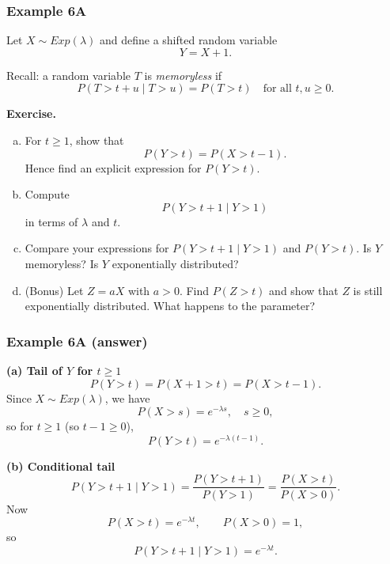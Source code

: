 \documentclass[t,8pt]{beamer}
\begin{document}
\begin{frame}
	\frametitle{Example 6A}
	
	Let $X \sim Exp(\lambda)$ and define a shifted random variable
	\[
	Y = X + 1.
	\]
	
	Recall: a random variable $T$ is \emph{memoryless} if
	\[
	P(T > t + u \mid T > u) = P(T > t)
	\quad \text{for all } t,u \ge 0.
	\]
	
	\vspace{4pt}
	\textbf{Exercise.}
	\begin{enumerate}[(a)]
		\item For $t \ge 1$, show that
		\[
		P(Y > t) = P(X > t - 1).
		\]
		Hence find an explicit expression for $P(Y > t)$.
		\item Compute
		\[
		P(Y > t+1 \mid Y > 1)
		\]
		in terms of $\lambda$ and $t$.
		\item Compare your expressions for $P(Y > t+1 \mid Y > 1)$ and $P(Y > t)$.
		Is $Y$ memoryless? Is $Y$ exponentially distributed?
		\item (Bonus) Let $Z = aX$ with $a>0$. Find $P(Z>t)$ and show that $Z$
		is still exponentially distributed. What happens to the parameter?
	\end{enumerate}
	
\end{frame}

\begin{frame}
	\frametitle{Example 6A (answer)}
	
	\textbf{(a) Tail of $Y$ for $t \ge 1$}
	\[
	P(Y > t)
	= P(X + 1 > t)
	= P(X > t - 1).
	\]
	Since $X \sim Exp(\lambda)$, we have
	\[
	P(X > s) = e^{-\lambda s}, \quad s \ge 0,
	\]
	so for $t \ge 1$ (so $t-1 \ge 0$),
	\[
	P(Y > t) = e^{-\lambda (t-1)}.
	\]
	
	\vspace{6pt}
	\textbf{(b) Conditional tail}
	\[
	P(Y > t+1 \mid Y > 1)
	= \frac{P(Y > t+1)}{P(Y > 1)}
	= \frac{P(X > t)}{P(X > 0)}.
	\]
	Now
	\[
	P(X > t) = e^{-\lambda t}, \qquad P(X > 0) = 1,
	\]
	so
	\[
	P(Y > t+1 \mid Y > 1) = e^{-\lambda t}.
	\]
	
\end{frame}
\end{document}
